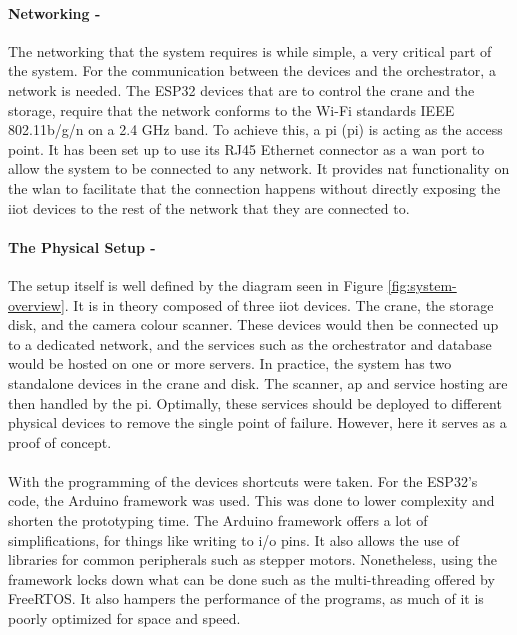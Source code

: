 \paragraph{Networking -}
The networking that the system requires is while simple, a very critical part of the system. For the communication between the devices and the orchestrator, a network is needed. The ESP32 devices that are to control the crane and the storage, require that the network conforms to the Wi-Fi standards IEEE 802.11b/g/n\cite{802.11} on a 2.4 GHz band. To achieve this, a \acrlong{pi} (\acrshort{pi}) is acting as the access point. It has been set up to use its RJ45 Ethernet connector as a \acrshort{wan} port to allow the system to be connected to any network. It provides \acrshort{nat} functionality on the \acrshort{wlan} to facilitate that the connection happens without directly exposing the \acrshort{iiot} devices to the rest of the network that they are connected to.\hfill

\paragraph{The Physical Setup -} The setup itself is well defined by the diagram seen in Figure \ref{fig:system-overview}. It is in theory composed of three \acrshort{iiot} devices. The crane, the storage disk, and the camera colour scanner. These devices would then be connected up to a dedicated network, and the services such as the orchestrator and database would be hosted on one or more servers. In practice, the system has two standalone devices in the crane and disk. The scanner, \acrshort{ap} and service hosting are then handled by the \acrshort{pi}. Optimally, these services should be deployed to different physical devices to remove the single point of failure. However, here it serves as a proof of concept.
\paragraph{} With the programming of the devices shortcuts were taken. For the ESP32's code, the Arduino framework was used. This was done to lower complexity and shorten the prototyping time. The Arduino framework offers a lot of simplifications, for things like writing to i/o pins. It also allows the use of libraries for common peripherals such as stepper motors. Nonetheless, using the framework locks down what can be done such as the multi-threading offered by FreeRTOS. It also hampers the performance of the programs, as much of it is poorly optimized for space and speed.
